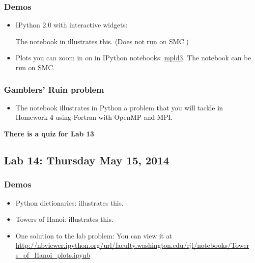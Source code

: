 \documentclass[letterpaper,10pt,english]{sphinxmanual}
\begin{document}
\subsubsection{Demos}
\label{labs/lab13:demos}\begin{itemize}
\item {} 
IPython 2.0 with interactive widgets:

The notebook in  illustrates this.
(Does not run on SMC.)

\item {} 
Plots you can zoom in on in IPython notebooks:
\href{https://github.com/jakevdp/mpld3}{mpld3}.
The notebook 
can be run on SMC.

\end{itemize}


\subsubsection{Gamblers' Ruin problem}
\label{labs/lab13:gamblers-ruin-problem}\begin{itemize}
\item {} 
The notebook 
illustrates in Python a problem that you will tackle in Homework 4
using Fortran with OpenMP and MPI.

\end{itemize}

\textbf{There is a quiz for Lab 13}


\subsection{Lab 14: Thursday May 15, 2014}
\label{labs/lab14:lab14}\label{labs/lab14::doc}\label{labs/lab14:lab-14-thursday-may-15-2014}

\subsubsection{Demos}
\label{labs/lab14:demos}\begin{itemize}
\item {} 
Python dictionaries: 
illustrates this.

\item {} 
Towers of Hanoi: 
illustrates this.

\item {} 
One solution to the lab problem: 
You can view it at
\url{http://nbviewer.ipython.org/url/faculty.washington.edu/rjl/notebooks/Towers\_of\_Hanoi\_plots.ipynb}

\end{itemize}
\end{document}
